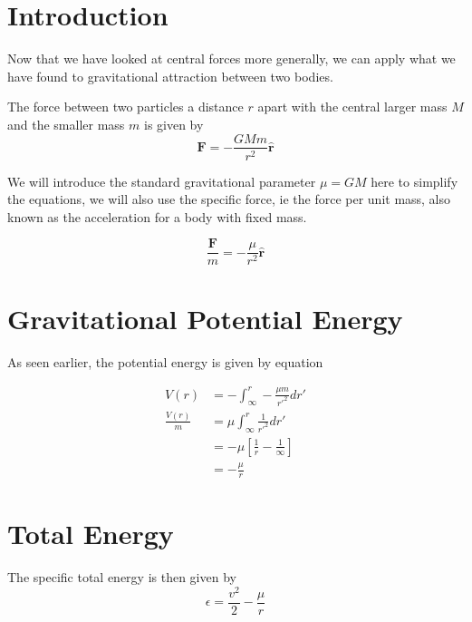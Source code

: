 \section{Introduction}

Now that we have looked at central forces more generally, we can apply what we have found to gravitational attraction between two bodies.

The force between two particles a distance $r$ apart with the central larger mass $M$ and the smaller mass $m$ is given by
\begin{equation}
\mathbf{F} = -\frac{G M m}{r^2} \hat{\mathbf{r}}
\end{equation}

We will introduce the standard gravitational parameter $\mu = GM$ here to simplify the equations, we will also use
the specific force, ie the force per unit mass, also known as the acceleration for a body with fixed mass.

\begin{equation}
\frac{\mathbf{F}}{m} = -\frac{\mu}{r^2} \hat{\mathbf{r}} \label{eq:gravity0}
\end{equation}

\section{Gravitational Potential Energy}

As seen earlier, the potential energy is given by equation 

\begin{align}
V(r)&=-\int_{\infty}^{r} -\frac{\mu m}{r'^2} dr' \nonumber \\
\frac{V(r)}{m}&=\mu \int_{\infty}^{r} \frac{1}{r'^2} dr' \nonumber \\
&=-\mu \left[ \frac{1}{r} - \frac{1}{\infty} \right] \nonumber \\
&= - \frac{\mu}{r}\label{eq:gravity1}
\end{align}

\section{Total Energy}

The specific total energy is then given by
\begin{equation}
\epsilon = \frac{v^2}{2} - \frac{\mu}{r} \label{eq:gravity7}
\end{equation}

